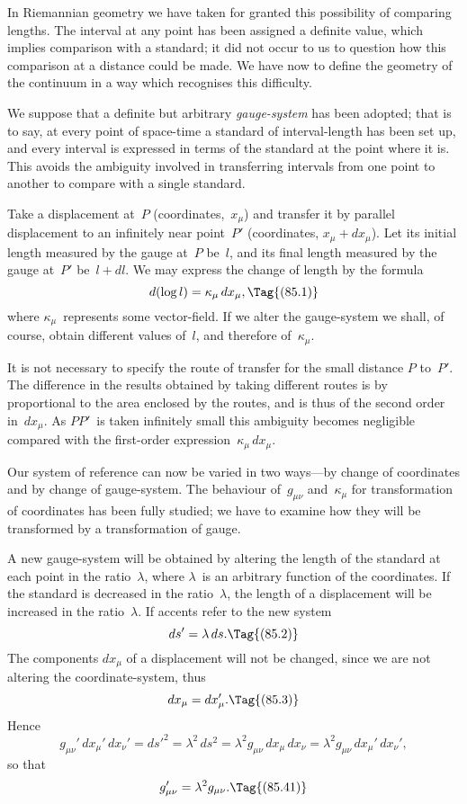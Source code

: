\documentclass[12pt]{book}
\begin{document}
In Riemannian geometry we have taken for granted this possibility of
comparing lengths. The interval at any point has been assigned a definite
value, which implies comparison with a standard; it did not occur to us to
question how this comparison at a distance could be made. We have now to
define the geometry of the continuum in a way which recognises this difficulty.

We suppose that a definite but arbitrary \emph{gauge\hyp{}system} has been adopted;
%
that is to say, at every point of space-time a standard of interval\hyp{}length has
been set up, and every interval is expressed in terms of the standard at the
point where it is. This avoids the ambiguity involved in transferring intervals
from one point to another to compare with a single standard.

Take a displacement at~$P$ (coordinates,~$x_{\mu}$) and transfer it by parallel displacement
to an infinitely near point~$P'$ (coordinates, $x_{\mu} + dx_{\mu}$). Let its initial
length measured by the gauge at~$P$ be~$l$, and its final length measured by the
gauge at~$P'$ be~$l + dl$. We may express the change of length by the formula
\[
d(\log l) = \kappa_{\mu}\, dx_{\mu},
\Tag{(85.1)}
\]
where $\kappa_{\mu}$~represents some vector\hyp{}field. If we alter the gauge\hyp{}system we shall,
of course, obtain different values of~$l$, and therefore of~$\kappa_{\mu}$.

It is not necessary to specify the route of transfer for the small distance
$P$ to~$P'$. The difference in the results obtained by taking different routes is
by~ proportional to the area enclosed by the routes, and is thus of the
second order in~$dx_{\mu}$. As $PP'$~is taken infinitely small this ambiguity becomes
negligible compared with the first\hyp{}order expression~$\kappa_{\mu}\, dx_{\mu}$.

Our system of reference can now be varied in two ways---by change of
coordinates and by change of gauge\hyp{}system. The behaviour of~$g_{\mu\nu}$ and~$\kappa_{\mu}$ for
transformation of coordinates has been fully studied; we have to examine how
they will be transformed by a transformation of gauge.

A new gauge\hyp{}system will be obtained by altering the length of the standard
at each point in the ratio~$\lambda$, where $\lambda$~is an arbitrary function of the coordinates.
If the standard is decreased in the ratio~$\lambda$, the length of a displacement will
be increased in the ratio~$\lambda$. If accents refer to the new system
\[
ds' = \lambda\, ds.
\Tag{(85.2)}
\]
The components $dx_{\mu}$ of a displacement will not be changed, since we are not
altering the coordinate\hyp{}system, thus
\[
dx_{\mu} = dx_{\mu}'.
\Tag{(85.3)}
\]
Hence
\[
g_{\mu\nu}'\, dx_{\mu}'\, dx_{\nu}'
= ds'^{2}
= \lambda^2\, ds^{2}
= \lambda^2 g_{\mu\nu}\, dx_{\mu}\, dx_{\nu}
= \lambda^2 g_{\mu\nu}\, dx_{\mu}'\, dx_{\nu}',
\]
so that
\[
g_{\mu\nu}' = \lambda^2 g_{\mu\nu}.
\Tag{(85.41)}
\]
\end{document}
